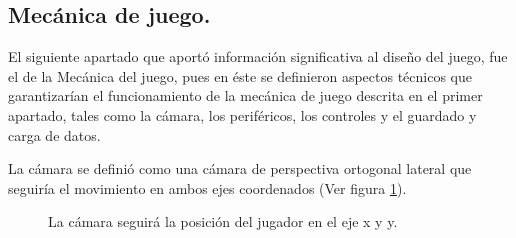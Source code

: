 \subsection{Mecánica de juego.}
El siguiente apartado que aportó información significativa al diseño del juego, fue el de la Mecánica del juego, pues en éste se definieron aspectos técnicos que garantizarían el funcionamiento de la mecánica de juego descrita en el primer apartado, tales como la cámara, los periféricos, los controles y el guardado y carga de datos. 
\\
\par
La cámara se definió como una cámara de perspectiva ortogonal lateral que seguiría el movimiento en ambos ejes coordenados (Ver figura \ref{fig:Camara}).

\begin{figure}
  \centering
  \caption{La cámara seguirá la posición del jugador en el eje x y y.}
  \label{fig:Camara}
\end{figure} 
 

